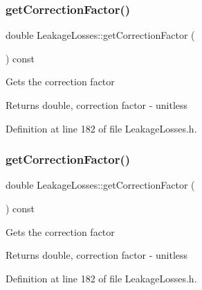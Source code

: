 \mbox{\label{class_leakage_losses_ad4f289a7490cd3fd4dfc4099fc4ad562}} 
\subsubsection{\texorpdfstring{get\+Correction\+Factor()}{getCorrectionFactor()}\hspace{0.1cm}{\footnotesize\ttfamily [2/3]}}
{\footnotesize\ttfamily double Leakage\+Losses\+::get\+Correction\+Factor (\begin{DoxyParamCaption}{ }\end{DoxyParamCaption}) const\hspace{0.3cm}{\ttfamily [inline]}}

Gets the correction factor

\begin{DoxyReturn}{Returns}
double, correction factor -\/ unitless 
\end{DoxyReturn}


Definition at line 182 of file Leakage\+Losses.\+h.

\mbox{\label{class_leakage_losses_ad4f289a7490cd3fd4dfc4099fc4ad562}} 
\subsubsection{\texorpdfstring{get\+Correction\+Factor()}{getCorrectionFactor()}\hspace{0.1cm}{\footnotesize\ttfamily [3/3]}}
{\footnotesize\ttfamily double Leakage\+Losses\+::get\+Correction\+Factor (\begin{DoxyParamCaption}{ }\end{DoxyParamCaption}) const\hspace{0.3cm}{\ttfamily [inline]}}

Gets the correction factor

\begin{DoxyReturn}{Returns}
double, correction factor -\/ unitless 
\end{DoxyReturn}


Definition at line 182 of file Leakage\+Losses.\+h.

